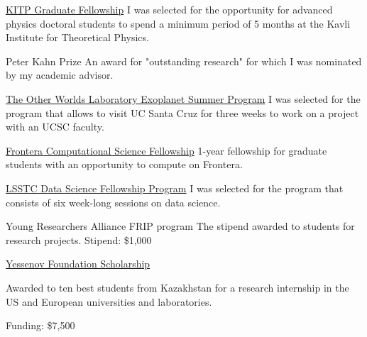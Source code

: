 \documentclass[10pt]{article} %
\begin{document}
\begin{paracol}{1}
	
	{\href{https://www.kitp.ucsb.edu/apply/fellowships/graduate-fellowship-program}{KITP Graduate Fellowship}} %
	{I was selected for the opportunity for advanced physics doctoral students to spend a minimum period of 5 months at the Kavli Institute for Theoretical Physics.} %

	{Peter Kahn Prize} %
	{An award for "outstanding research" for which I was nominated by my academic advisor.} %

	{\href{https://owl.ucsc.edu/summer/}{The Other Worlds Laboratory Exoplanet Summer Program}} %
	{I was selected for the program that allows to visit UC Santa Cruz for three weeks to work on a project with an UCSC faculty.} %

	{\href{https://frontera-portal.tacc.utexas.edu/fellowship/}{Frontera Computational Science Fellowship}} %
	{1-year fellowship for graduate students with an opportunity to compute on Frontera.} %

	{\href{https://www.lsstcorporation.org/fellowship_program}{LSSTC Data Science Fellowship Program}} %
	{I was selected for the program that consists of six week-long sessions on data science.} %
	
	{Young Researchers Alliance FRIP program}
	{The stipend awarded to students for research projects. Stipend: \$1,000}
	
	
	\nonstopmode
	{\href{http://yessenovfoundation.org/en/}{Yessenov Foundation Scholarship}}
	{Awarded to ten best students from Kazakhstan for a research  internship in the US and European universities and laboratories. 
	
	Funding: \$7,500}
	
	

\end{paracol}
\end{document}
